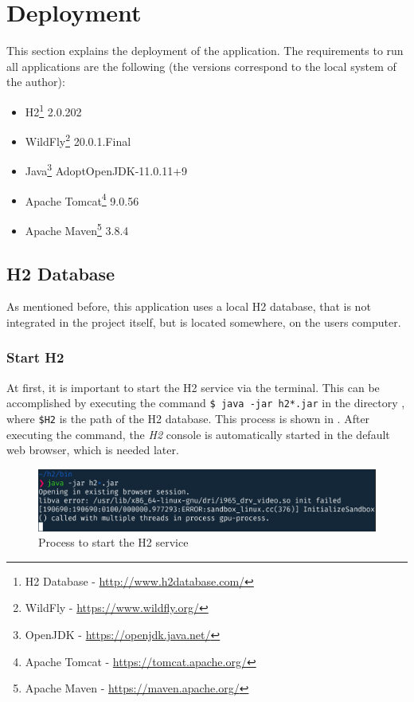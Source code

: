 \section{Deployment}\label{sec:03_depl}
This section explains the deployment of the application.
The requirements to run all applications are the following (the versions correspond to the local system of the author):
\begin{itemize}
\item H2\footnote{H2 Database - \url{http://www.h2database.com/}} 2.0.202
\item WildFly\footnote{WildFly - \url{https://www.wildfly.org/}} 20.0.1.Final
\item Java\footnote{OpenJDK - \url{https://openjdk.java.net/}} AdoptOpenJDK-11.0.11+9
\item Apache Tomcat\footnote{Apache Tomcat - \url{https://tomcat.apache.org/}} 9.0.56
\item Apache Maven\footnote{Apache Maven - \url{https://maven.apache.org/}} 3.8.4
\end{itemize}


\subsection{H2 Database}\label{sec:03_depl_h2}
As mentioned before, this application uses a local H2 database, that is not integrated in the project itself, but is located somewhere, on the users computer.

\subsubsection{Start H2}\label{sec:03_depl_h2_start}
At first, it is important to start the H2 service via the terminal. This can be accomplished by executing the command \texttt{\$ java -jar h2*.jar} in the directory , where \texttt{\$H2} is the path of the H2 database. This process is shown in . After executing the command, the \textit{H2} console is automatically started in the default web browser, which is needed later.
\begin{figure}[h]
\centering
\includegraphics[scale=0.23]{images/03_depl/h2_start}
\caption{Process to start the H2 service}
\label{fig:03_depl_h2_h2start}
\end{figure}

